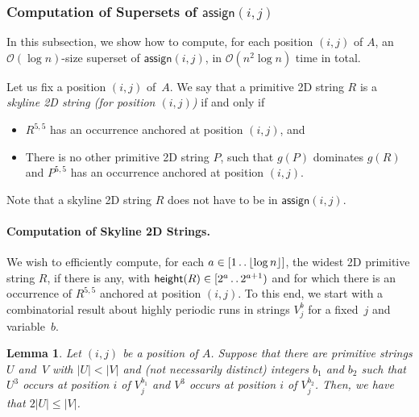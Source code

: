\documentclass[11pt,letterpaper]{article}
\newcommand{\cO}{\mathcal{O}}
\newcommand{\floor}[1]{\left\lfloor #1 \right\rfloor}
\newcommand{\height}{\textsf{height}}
\def\dd{\mathinner{.\,.}}
\newcommand{\assign}{\textsf{assign}}
\newcommand{\vmeta}[2]{V_{#1}^{#2}}
\newtheorem{lemma}[theorem]{Lemma}
\begin{document}
\subsubsection{Computation of Supersets of $\assign(i,j)$}

In this subsection, we show how to compute, for each position $(i,j)$ of $A$, an $\cO(\log n)$-size superset of $\assign(i,j)$, in $\cO(n^2 \log n)$ time in total.

Let us fix a position $(i,j)$ of~$A$.
We say that a primitive 2D string $R$ is a \emph{skyline 2D string (for position $(i,j)$)} if and only if
\begin{itemize}
\item $R^{5,5}$ has an occurrence anchored at position $(i,j)$, and
\item There is no other primitive 2D string $P$, such that $g(P)$ dominates $g(R)$ and $P^{5,5}$ has an occurrence anchored at position $(i,j)$.
\end{itemize}
Note that a skyline 2D string $R$ does not have to be in $\assign(i,j)$.

\paragraph{Computation of Skyline 2D Strings.}
We wish to efficiently compute, for each $a \in [1 \dd \floor{\log n}]$, the widest 2D primitive string $R$, if there is any, with $\height(R) \in [2^a \dd 2^{a+1})$ and for which there is an occurrence of $R^{5,5}$ anchored at position $(i,j)$.
To this end, we start with a combinatorial result about highly periodic runs in strings $\vmeta{j}{b}$ for a fixed~$j$ and variable~$b$.

\begin{lemma}\label{lem:runs_evol}
Let $(i,j)$ be a position of $A$. Suppose that there are primitive strings $U$ and~$V$ with $|U| < |V|$ and (not necessarily distinct) integers $b_1$ and $b_2$ such that 
$U^3$ occurs at position $i$ of $\vmeta{j}{b_1}$ and $V^3$ occurs at position $i$ of $\vmeta{j}{b_2}$.
Then, we have that $2|U|\leq |V|$.
\end{lemma}
\end{document}
